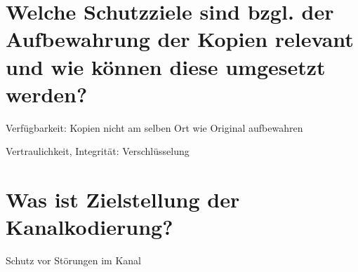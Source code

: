 \documentclass{article}
\begin{document}
	\section*{Welche Schutzziele sind bzgl. der Aufbewahrung der Kopien relevant und wie können diese umgesetzt werden?}
	Verfügbarkeit: Kopien nicht am selben Ort wie Original aufbewahren
	
	Vertraulichkeit, Integrität: Verschlüsselung
	
	\section*{Was ist Zielstellung der Kanalkodierung?}
	Schutz vor Störungen im Kanal
	
\end{document}

